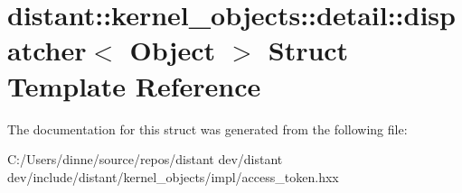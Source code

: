 \hypertarget{structdistant_1_1kernel__objects_1_1detail_1_1dispatcher}{}\section{distant\+:\+:kernel\+\_\+objects\+:\+:detail\+:\+:dispatcher$<$ Object $>$ Struct Template Reference}
\label{structdistant_1_1kernel__objects_1_1detail_1_1dispatcher}


The documentation for this struct was generated from the following file\+:\begin{DoxyCompactItemize}
\item 
C\+:/\+Users/dinne/source/repos/distant dev/distant dev/include/distant/kernel\+\_\+objects/impl/access\+\_\+token.\+hxx\end{DoxyCompactItemize}
